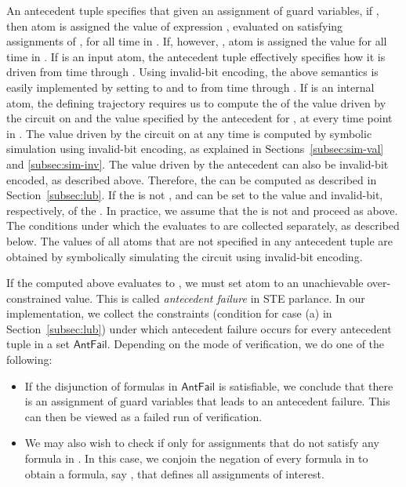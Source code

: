 \documentclass{llncs}
\newcommand{\AntFail}{\ensuremath{\mathsf{AntFail}}}
\begin{document}
An antecedent tuple  specifies that given an
assignment  of guard variables, if , then atom
 is assigned the value of expression , evaluated on satisfying
assignments of ,
for all time in .  If, however, , atom  is assigned the value  for all
time in .  If  is an input atom, the
antecedent tuple effectively specifies how it is driven from time
 through .  Using invalid-bit encoding, the above
semantics is easily implemented by setting  to  and
 to  from time  through .  If  is an
internal atom, the defining trajectory requires us to compute the
 of the value driven by the circuit on  and the value
specified by the antecedent for , at every time point in .  The value driven by the circuit on  at any time
is computed by symbolic simulation using invalid-bit encoding, as
explained in Sections~\ref{subsec:sim-val} and \ref{subsec:sim-inv}.
The value driven by the antecedent can also be invalid-bit encoded, as
described above.  Therefore, the  can be computed as described in
Section~\ref{subsec:lub}.  If the  is not ,  and
 can be set to the value and invalid-bit, respectively, of
the .  In practice, we assume that the  is not  and
proceed as above. The conditions under which the  evaluates to
 are collected separately, as described below.  The values of
all atoms that are not specified in any antecedent tuple are obtained
by symbolically simulating the circuit using invalid-bit encoding.

If the  computed above evaluates to , we must set atom 
to an unachievable over-constrained value.  This is called
\emph{antecedent failure} in STE parlance.  In our implementation, we
collect the constraints (condition for case (a) in
Section~\ref{subsec:lub}) under which antecedent failure occurs for
every antecedent tuple in a set {\AntFail}.  Depending on the mode of
verification, we do one of the following:
\begin{itemize}
\item If the disjunction of formulas in {\AntFail} is satisfiable, we
  conclude that there is an assignment of guard variables that leads
  to an antecedent failure.  This can then be viewed as a failed run
  of verification.
\item We may also wish to check if  only for assignments  that do not satisfy
  any formula in .  In this case, we conjoin the negation
  of every formula in  to obtain a formula, say
  , that defines all assignments  of interest.
\end{itemize}
\end{document}
